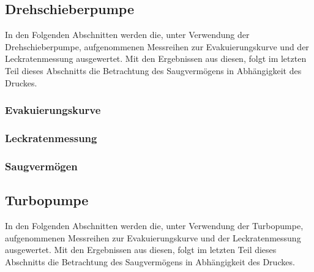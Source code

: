 \subsection{Drehschieberpumpe}
In den Folgenden Abschnitten werden die, unter Verwendung der Drehschieberpumpe, aufgenommenen Messreihen 
zur Evakuierungskurve und der Leckratenmessung ausgewertet. Mit den Ergebnissen aus diesen, folgt im letzten Teil dieses 
Abschnitts die Betrachtung des Saugvermögens in Abhängigkeit des Druckes.

\subsubsection{Evakuierungskurve}



{
\FloatBarrier

\FloatBarrier

\FloatBarrier

\FloatBarrier}

\subsubsection{Leckratenmessung}




\FloatBarrier

\FloatBarrier

\FloatBarrier

\FloatBarrier
\subsubsection{Saugvermögen}



\FloatBarrier

\subsection{Turbopumpe}
In den Folgenden Abschnitten werden die, unter Verwendung der Turbopumpe, aufgenommenen Messreihen 
zur Evakuierungskurve und der Leckratenmessung ausgewertet. Mit den Ergebnissen aus diesen, folgt im letzten Teil dieses 
Abschnitts die Betrachtung des Saugvermögens in Abhängigkeit des Druckes.

